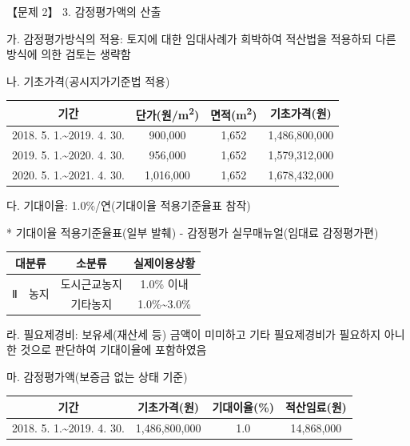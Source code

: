 \begin{longquestion}{【문제 2】}
3. 감정평가액의 산출 \par
\hspace*{1em}가. 감정평가방식의 적용: 토지에 대한 임대사례가 희박하여 적산법을 적용하되 다른 방식에 의한 검토는 생략함 \par
\hspace*{1em}나. 기초가격(공시지가기준법 적용) \par
{\small\centering
\begin{tabular}{|c|c|c|c|}\hline
기간 & 단가(원/m\textsuperscript{2}) & 면적(m\textsuperscript{2}) & 기초가격(원) \\\hline
2018. 5. 1.\textasciitilde{}2019. 4. 30. & 900,000 & 1,652 & 1,486,800,000 \\\hline
2019. 5. 1.\textasciitilde{}2020. 4. 30. & 956,000 & 1,652 & 1,579,312,000 \\\hline
2020. 5. 1.\textasciitilde{}2021. 4. 30. & 1,016,000 & 1,652 & 1,678,432,000 \\\hline
\end{tabular}\par}
\hspace*{1em}다. 기대이율: 1.0\%/연(기대이율 적용기준율표 참작) \par
\hspace*{2em}* 기대이율 적용기준율표(일부 발췌) - 감정평가 실무매뉴얼(임대료 감정평가편) \par
{\small\centering
\begin{tabular}{|c|c|c|c|}\hline
\multicolumn{2}{|c|}{대분류} & 소분류 & 실제이용상황 \\\hline
\multirow{2}{*}{Ⅱ} & \multirow{2}{*}{농지} & 도시근교농지 & 1.0\% 이내 \\\cline{3-4}
 &  & 기타농지 & 1.0\%\textasciitilde{}3.0\% \\\hline
\end{tabular}\par}
\hspace*{1em}라. 필요제경비: 보유세(재산세 등) 금액이 미미하고 기타 필요제경비가 필요하지 아니한 것으로 판단하여 기대이율에 포함하였음 \par
\hspace*{1em}마. 감정평가액(보증금 없는 상태 기준) \par
{\small\centering
\begin{tabular}{|c|c|c|c|}\hline
기간 & 기초가격(원) & 기대이율(\%) & 적산임료(원) \\\hline
2018. 5. 1.\textasciitilde{}2019. 4. 30. & 1,486,800,000 & 1.0 & 14,868,000 \\\hline

\end{tabular}}
\end{longquestion}
